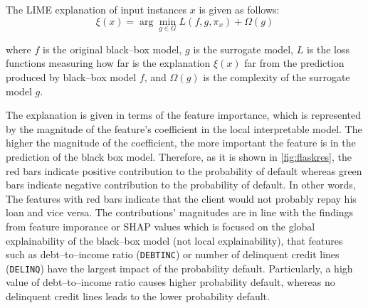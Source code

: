 The LIME explanation of input instances $x$ is given as follows:
\begin{equation}\label{eq}
\xi(x) = \arg\min_{g \in G} L(f, g, \pi_x) + \Omega(g)
\end{equation}

where $f$ is the original black--box model, $g$ is the surrogate model, $L$ is the loss functions measuring how far is the explanation $\xi(x)$ far from the prediction produced by black--box model $f$, and $\Omega(g)$ is the complexity of the surrogate model $g$.


The explanation is given in terms of the feature importance, which is represented by the magnitude of the feature's coefficient in the local interpretable model. The higher the magnitude of the coefficient, the more important the feature is in the prediction of the black box model.
Therefore, as it is shown in \autoref{fig:flaskres}, the red bars indicate positive contribution to the probability of default whereas green bars indicate negative contribution to the probability of default. In other words, The features with red bars indicate that the client would not probably repay his loan and vice versa.
The contributions' magnitudes are in line with the findings from feature imporance or SHAP values which is focused on the global explainability of the black--box model (not local explainability), that features such as debt--to--income ratio (\texttt{DEBTINC}) or number of delinquent credit lines (\texttt{DELINQ}) have the largest impact of the probability default.
Particularly, a high value of debt--to--income ratio causes higher probability default, whereas no delinquent credit lines leads to the lower probability default.

